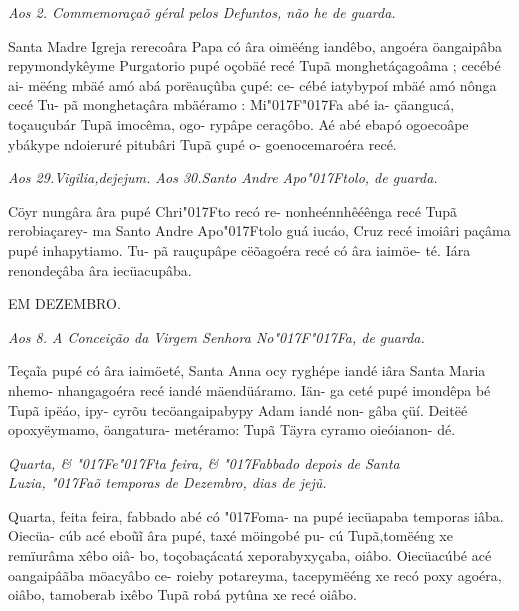 \documentclass[openany,titlepage,12pt]{book}
\newcommand{\lgS}{\char"017F}
\newcommand{\lgSS}{\char"017F\char"017F}
\begin{document}
\begin{center}
    \textit{\footnotesize Aos 2. Commemoraçaõ géral pelos Defuntos,
    não he de guarda.}
\end{center}

{\hspace*{-2ex}Santa Madre Igreja rerecoâra Papa có\linebreak
âra oimëéng iandêbo, angoéra öangaipâba
repymondykêyme Purgatorio pupé oçobäé
recé Tupã monghetáçagoâma ; cecébé ai-
mëéng mbäé amó abá porëauçûba çupé: ce-
cébé iatybypoí mbäé amó nônga cecé Tu-
pã monghetaçâra mbäéramo : Mi\lgSS a abé ia-
çäangucá, toçauçubár Tupã imocêma, ogo-
rypâpe ceraçôbo. Aé abé ebapó ogoecoâpe
ybákype ndoieruré pitubâri Tupã çupé o-
goenocemaroéra recé.}

\begin{center}
    \textit{\footnotesize Aos 29.Vigilia,dejejum.
    Aos 30.Santo Andre Apo\lgS tolo, de guarda.}
\end{center}


{\hspace*{-2ex}Cöyr nungâra âra pupé Chri\lgS to  recó re-
nonheénnhêéênga recé Tupã rerobiaçarey-
ma Santo Andre Apo\lgS tolo guá iucáo, Cruz
recé imoiâri paçâma pupé inhapytiamo. Tu-
pã rauçupâpe cëõagoéra recé có âra iaimöe-
té. Iára renondeçâba âra iecüacupâba.\newpage}

\begin{center}
    {EM DEZEMBRO.\\}
\end{center}
\begin{center}
    \textit{\footnotesize Aos 8. A Conceição da Virgem Senhora No\lgSS a,
    de guarda.
    }
\end{center}


{\hspace*{-2ex}Teça\~ia pupé có âra iaimöeté, Santa Anna
ocy ryghépe iandé iâra Santa Maria nhemo-
nhangagoéra recé iandé mäendüáramo. Iän-
ga ceté pupé imondêpa bé Tupã ipëáo, ipy-
cyrõu tecöangaipabypy Adam iandé non-
gâba çüí. Deitëé opoxyëymamo, öangatura-
metéramo: Tupã Täyra cyramo oieóianon-
dé.}

\begin{center}
    \textit{\footnotesize Quarta, \& \lgS e\lgS ta feira,
    \& \lgS abbado depois de Santa\\
    Luzia, \lgS aõ temporas de Dezembro, dias de jej\~u.
    }
\end{center}


{\hspace{-2ex}Quarta, feita feira, fabbado abé có \lgS oma-
na pupé iecüapaba temporas iâba. Oiecüa-
cúb acé ebo\~u\~i âra pupé, taxé möingobé pu-
cú Tupã,tomëéng xe remïurâma xêbo oiâ-
bo, toçobaçácatá xeporabyxyçaba, oiâbo.\linebreak
Oiecüacúbé acé oangaipâãba möacyâbo ce-
roieby potareyma, tacepymëéng xe recó\linebreak
poxy agoéra, oiâbo, tamoberab ixêbo Tupã
robá pytûna xe recé oiâbo.\newpage}
\end{document}
